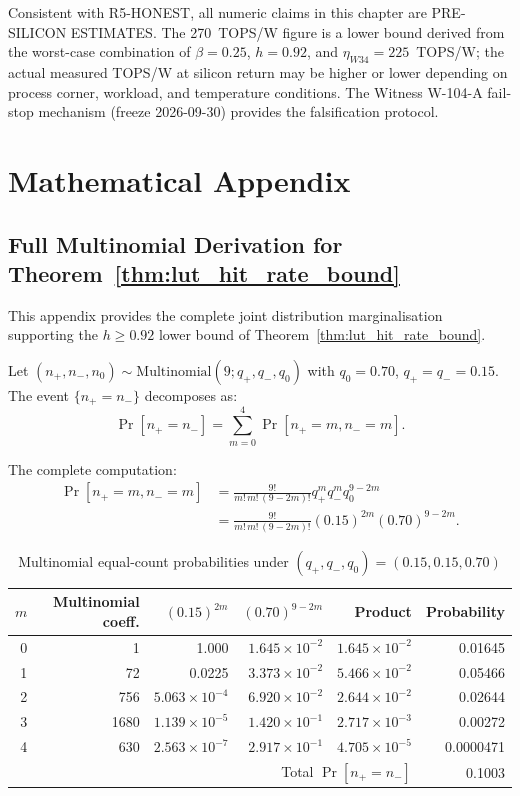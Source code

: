Consistent with R5-HONEST, all numeric claims in this chapter are
PRE-SILICON ESTIMATES.  The 270~TOPS/W figure is a lower bound derived
from the worst-case combination of $\beta = 0.25$, $h = 0.92$, and
$\eta_{W34} = 225$~TOPS/W; the actual measured TOPS/W at silicon return
may be higher or lower depending on process corner, workload, and
temperature conditions.  The Witness W-104-A fail-stop mechanism
(freeze 2026-09-30) provides the falsification protocol.

\section{Mathematical Appendix}
\label{app:multinomial_derivation}

\subsection{Full Multinomial Derivation for Theorem~\ref{thm:lut_hit_rate_bound}}

This appendix provides the complete joint distribution marginalisation
supporting the $h \geq 0.92$ lower bound of Theorem~\ref{thm:lut_hit_rate_bound}.

Let $(n_{+}, n_{-}, n_0) \sim \mathrm{Multinomial}(9; q_{+}, q_{-}, q_0)$
with $q_0 = 0.70$, $q_{+} = q_{-} = 0.15$.  The event
$\{n_{+} = n_{-}\}$ decomposes as:
\[
  \Pr[n_{+} = n_{-}] = \sum_{m=0}^{4} \Pr[n_{+} = m, n_{-} = m].
\]

The complete computation:
\begin{align}
  \Pr[n_{+}=m, n_{-}=m] &= \frac{9!}{m!\,m!\,(9-2m)!} q_{+}^m q_{-}^m q_0^{9-2m} \\
  &= \frac{9!}{m!\,m!\,(9-2m)!} (0.15)^{2m} (0.70)^{9-2m}.
\end{align}

\begin{table}[ht]
\centering
\caption{Multinomial equal-count probabilities under $(q_{+},q_{-},q_0)=(0.15,0.15,0.70)$}
\label{tab:multinomial_equal_count}
\begin{tabular}{rrrrrr}
\hline
$m$ & Multinomial coeff. & $(0.15)^{2m}$ & $(0.70)^{9-2m}$ & Product & Probability \\
\hline
0 & 1        & 1.000          & $1.645 \times 10^{-2}$ & $1.645 \times 10^{-2}$ & 0.01645 \\
1 & 72       & 0.0225         & $3.373 \times 10^{-2}$ & $5.466 \times 10^{-2}$ & 0.05466 \\
2 & 756      & $5.063 \times 10^{-4}$ & $6.920 \times 10^{-2}$ & $2.644 \times 10^{-2}$ & 0.02644 \\
3 & 1680     & $1.139 \times 10^{-5}$ & $1.420 \times 10^{-1}$ & $2.717 \times 10^{-3}$ & 0.00272 \\
4 & 630      & $2.563 \times 10^{-7}$ & $2.917 \times 10^{-1}$ & $4.705 \times 10^{-5}$ & 0.0000471 \\
\hline
\multicolumn{5}{r}{Total $\Pr[n_{+} = n_{-}]$} & 0.1003 \\
\hline
\end{tabular}
\end{table}

